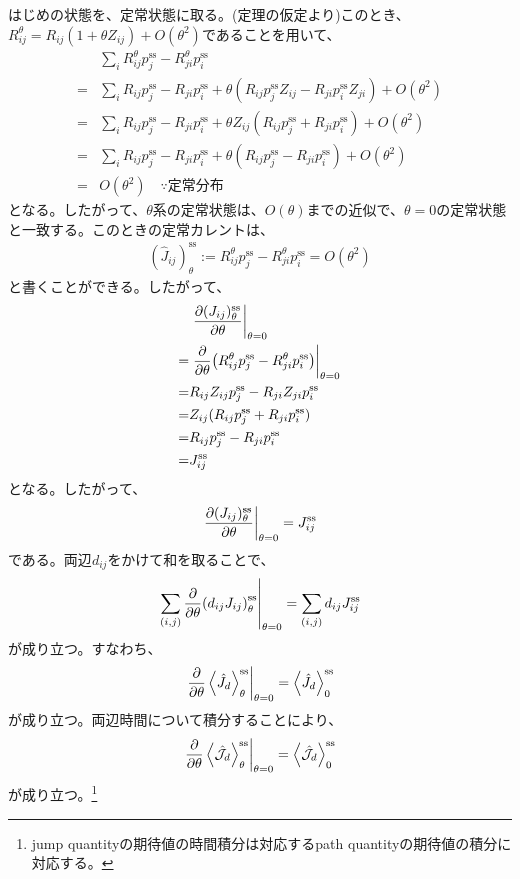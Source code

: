 \documentclass[a4paper,11pt]{jsarticle}
\numberwithin{equation}{section}
\begin{document}
はじめの状態を、定常状態に取る。(定理の仮定より)このとき、$R_{ij} ^{\theta} = R_{ij}(1+\theta Z_{ij}) + O(\theta^2)$であることを用いて、
\begin{align}
    &\sum_{i}R_{ij}^{\theta} p_j^\text{ss} - R_{ji}^{\theta} p_i^\text{ss} \\
    =& \sum_{i}R_{ij} p_j^\text{ss} - R_{ji} p_i^\text{ss} + \theta (R_{ij} p_j^\text{ss} Z_{ij} - R_{ji} p_i^\text{ss} Z_{ji}) + O(\theta^2)\\
    =& \sum_{i}R_{ij} p_j^\text{ss} - R_{ji} p_i^\text{ss} + \theta Z_{ij}(R_{ij} p_j^\text{ss} + R_{ji} p_i^\text{ss}) + O(\theta^2)\\
    =& \sum_{i}R_{ij} p_j^\text{ss} - R_{ji} p_i^\text{ss} + \theta  (R_{ij} p_j^\text{ss} - R_{ji} p_i^\text{ss}) + O(\theta^2)\\
    =& O(\theta^2) \quad \because \text{定常分布}
\end{align}
となる。したがって、$\theta$系の定常状態は、$O(\theta)$までの近似で、$\theta = 0$の定常状態と一致する。このときの定常カレントは、
\begin{align}
   (\hat{J}_{ij})_\theta^{\text{ss}}:= R_{ij}^\theta p_j^\text{ss} - R_{ji}^\theta p_i^\text{ss} = O(\theta^2)
\end{align}
と書くことができる。したがって、
\begin{align}
    &\eval{\pdv{({{{J}}_{ij}})^{\text{ss}}_\theta}{\theta}}_{\theta = 0} \\
    =& \eval{\pdv{\theta} (R_{ij}^\theta p_j^\text{ss} - R_{ji}^\theta p_i^\text{ss})}_{\theta = 0} \\
    =&  R_{ij} Z_{ij} p_j^\text{ss} - R_{ji} Z_{ji} p_i^\text{ss} \\
    =&  Z_{ij} (R_{ij} p_j^\text{ss} + R_{ji} p_i^\text{ss}) \\
    =&  R_{ij}p_j^\text{ss} - R_{ji}p_i^\text{ss} \\
    =& {J}_{ij}^\text{ss}
\end{align}
となる。したがって、
\begin{align}
    \eval{\pdv{({{J}_{ij}})^{\text{ss}}_\theta}{\theta}}_{\theta = 0} = {J}_{ij}^{\text{ss}}
\end{align}
である。両辺$d_{ij}$をかけて和を取ることで、
\begin{align}
    \left.\sum_{(i,j)} \pdv{\theta} ({d_{ij}{J}_{ij}})^{\text{ss}}_\theta \right|_{\theta = 0} = \sum_{(i,j)} d_{ij} {J}_{ij}^{\text{ss}}
\end{align}
が成り立つ。すなわち、
\begin{align}
    \left.\pdv{\theta} \ev{\hat{{J}}_{d}}^{\text{ss}}_\theta\right|_{\theta = 0} = \ev{\hat{{J}}_{d}}^{\text{ss}}_{0}
\end{align}
が成り立つ。両辺時間について積分することにより、
\begin{align}
    \left.\pdv{\theta} \ev{\hat{{\mathcal{J}}_{d}}}^{\text{ss}}_\theta\right|_{\theta = 0} = \ev{\hat{{\mathcal{J}}_{d}}}^{\text{ss}}_{0}
\end{align}
が成り立つ。\footnote{jump quantityの期待値の時間積分は対応するpath quantityの期待値の積分に対応する。}
\end{document}
